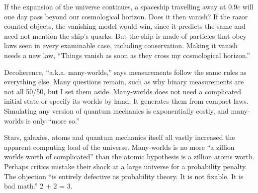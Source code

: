 If the expansion of the universe continues, a spaceship travelling away at 0.9$c$ will one day pass beyond our cosmological horizon. Does it then vanish? If the razor counted objects, the vanishing model would win, since it predicts the same and need not mention the ship's quarks. But the ship is made of particles that obey laws seen in every examinable case, including conservation. Making it vanish needs a new law, ``Things vanish as soon as they cross my cosmological horizon.'' 

Decoherence, ``a.k.a. many-worlds,'' says measurements follow the same rules as everything else.  Many questions remain, such as why binary measurements are not all 50/50, but I set them aside.  Many-worlds does not need a complicated initial state or specify its worlds by hand. It generates them from compact laws. Simulating any version of quantum mechanics is exponentially costly, and many-worlds is only ``more so.'' 

Stars, galaxies, atoms and quantum mechanics itself all vastly increased the apparent computing load of the universe. Many-worlds is no more ``a zillion worlds worth of complicated'' than the atomic hypothesis is a zillion atoms worth. Perhaps critics mistake their shock at a large universe for a probability penalty. The objection ``is entirely defective as probability theory. It is not fixable. It is bad math.'' 2 + 2 = 3. 
